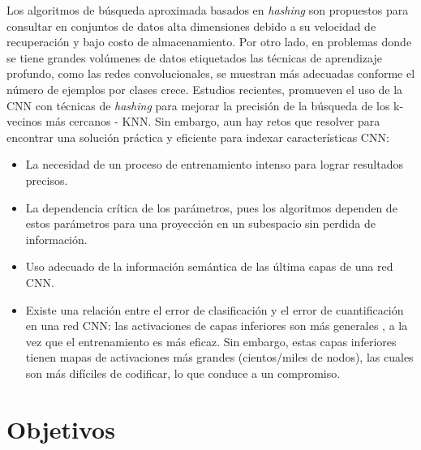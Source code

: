 Los  algoritmos de búsqueda aproximada  basados en \textit{hashing} son propuestos para consultar en conjuntos de datos  alta dimensiones debido a su velocidad de recuperación y bajo costo de almacenamiento.  Por otro lado, en problemas donde se tiene grandes volúmenes de datos etiquetados las técnicas de aprendizaje profundo, como las redes convolucionales, se muestran más adecuadas conforme el número de ejemplos por clases crece. Estudios recientes, promueven el uso de la \acf{CNN} con técnicas de  \textit{hashing} para mejorar la precisión de la búsqueda de los k-vecinos más cercanos - KNN.  Sin embargo, aun hay retos que resolver para encontrar una solución práctica y eficiente para indexar características  CNN:
\begin{itemize}
  \item La necesidad de un proceso de entrenamiento intenso para lograr resultados precisos.

  \item  La dependencia crítica de los parámetros, pues los algoritmos dependen de  estos parámetros  para una proyección en un subespacio sin perdida de información.

  \item  Uso adecuado de la informaci\'on sem\'antica de las  última capas de una red CNN.

  \item  Existe una relación entre el error de clasificación y el error de cuantificación en una red CNN: las activaciones de capas inferiores son más generales \cite{DBLP:journals/corr/YosinskiCBL14}, a la vez que el entrenamiento es más eficaz. Sin embargo, estas capas inferiores tienen mapas de activaciones más grandes (cientos/miles de  nodos), las cuales son más difíciles de codificar, lo que conduce a un compromiso.
 
\end{itemize}

 

\section{Objetivos}\label{objs}


